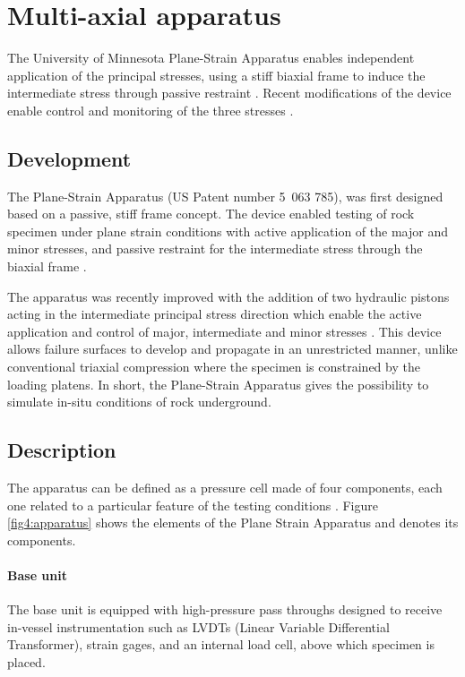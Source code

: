 \section{Multi-axial apparatus}

The University of Minnesota Plane-Strain Apparatus enables independent application of the principal stresses, using a stiff biaxial frame to induce the intermediate stress through passive restraint \cite{Labuz1996}. Recent modifications of the device enable control and monitoring of the three stresses \cite{Zeng2019}.

\subsection{Development}

The Plane-Strain Apparatus (US Patent number 5 063 785), was first designed based on a passive, stiff frame concept. The device enabled testing of rock specimen under plane strain conditions with active application of the major and minor stresses, and passive restraint for the intermediate stress through the biaxial frame \cite{Labuz1996}. 

The apparatus was recently improved with the addition of two hydraulic pistons acting in the intermediate principal stress direction which enable the active application and control of major, intermediate and minor stresses \cite{Zeng2019}. This device allows failure surfaces to develop and propagate in an unrestricted manner, unlike conventional triaxial compression where the specimen is constrained by the loading platens. In short, the Plane-Strain Apparatus gives the possibility to simulate in-situ conditions of rock underground. 

\subsection{Description}

The apparatus can be defined as a pressure cell made of four components, each one related to a particular feature of the testing conditions \cite{Labuz1996,Zeng2019}. Figure \ref{fig4:apparatus} shows the elements of the Plane Strain Apparatus and denotes its components. 

\paragraph{Base unit} 
The base unit is equipped with high-pressure pass throughs designed to receive in-vessel instrumentation such as LVDTs (Linear Variable Differential Transformer), strain gages, and an internal load cell, above which specimen is placed. 


